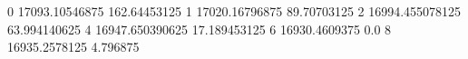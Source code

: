 0 17093.10546875 162.64453125
1 17020.16796875 89.70703125
2 16994.455078125 63.994140625
4 16947.650390625 17.189453125
6 16930.4609375 0.0
8 16935.2578125 4.796875
